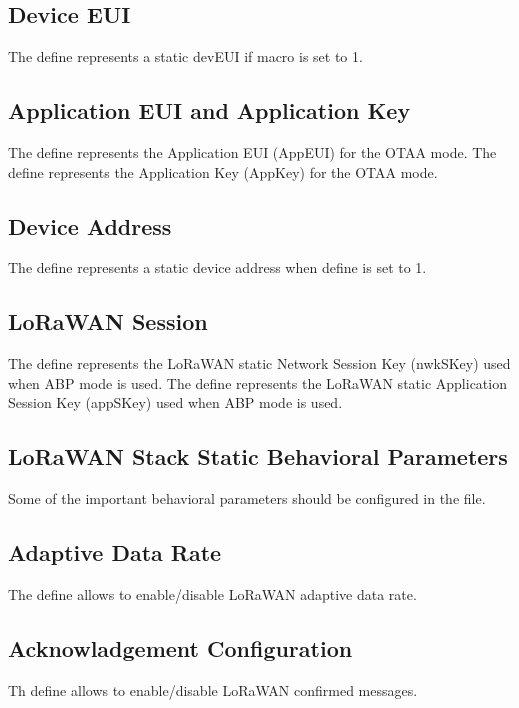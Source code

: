 \subsection*{Device EUI}
The  define represents a static devEUI if \break{} macro is set to 1.

\subsection*{Application EUI and Application Key}
The define  represents the Application EUI (AppEUI) for the OTAA mode.
The define  represents the Application Key (AppKey) for the OTAA mode.

\subsection*{Device Address}
The define  represents a static device address when  define is set to 1.

\subsection*{LoRaWAN Session}
The define  represents the LoRaWAN static Network Session Key (nwkSKey) used when ABP mode is used.
The define  represents the LoRaWAN static Application Session Key (appSKey) used when ABP mode is used.

\subsection{LoRaWAN Stack Static Behavioral Parameters}
Some of the important behavioral parameters should be configured in the  file. 

\subsection*{Adaptive Data Rate}
The define  allows to enable/disable LoRaWAN adaptive data rate.

\subsection*{Acknowladgement Configuration}
Th define  allows to enable/disable LoRaWAN confirmed messages.

